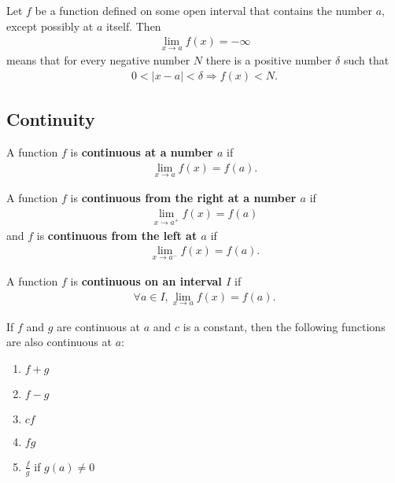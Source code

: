 \documentclass{article}
\begin{document}
\begin{definition}
    Let $f$ be a function defined on some open interval that contains the number $a$, except possibly at $a$ itself. Then
    \begin{align*}
        \lim_{x\to a}f(x) = -\infty
    \end{align*} 
    means that for every negative number $N$ there is a positive number $\delta$ such that
    \begin{align*}
        0<|x-a|<\delta \Rightarrow f(x)<N.
    \end{align*}
\end{definition}
\subsection{Continuity}
\begin{definition}
    A function $f$ is \textbf{continuous at a number $a$} if
    \begin{align*}
        \lim_{x\to a}f(x)=f(a).
    \end{align*}
\end{definition}
\begin{definition}
    A function $f$ is \textbf{continuous from the right at a number $a$} if
    \begin{align*}
        \lim_{x\to a^+}f(x) = f(a)
    \end{align*}
    and $f$ is \textbf{continuous from the left at $a$} if
    \begin{align*}
        \lim_{x\to a^-}f(x) = f(a).
    \end{align*}
\end{definition}
\begin{definition}
    A function $f$ is \textbf{continuous on an interval $I$} if 
    \begin{align*}
        \forall a \in I, \lim_{x\to a}f(x) = f(a).
    \end{align*}
\end{definition}
\begin{theorem}
    If $f$ and $g$ are continuous at $a$ and $c$ is a constant, then the following functions are also continuous at $a$:
    \begin{enumerate}
        \item $f+g$
        \item $f-g$
        \item $cf$
        \item $fg$
        \item $\frac{f}{g}$ if $g(a)\not= 0$
    \end{enumerate}
\end{theorem}
\end{document}
